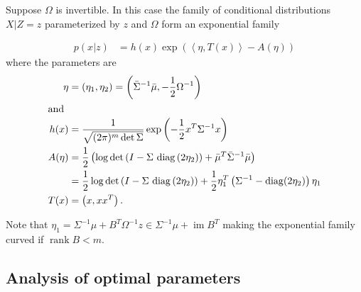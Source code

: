 \begin{proposition}
    \label{prop:exponential_family_posterior}
    Suppose $\Omega$ is invertible.
    In this case the family of conditional distributions $X|Z=z$ parameterized by $z$ and $\Omega$ form an exponential family

    \begin{align*}
        p(x|z) & = h(x) \exp \left( \left\langle \eta, T(x) \right\rangle - A(\eta)\right)
    \end{align*}
    where the parameters are 
    \begin{align*}
      \eta &= \left( \eta_{1}, \eta_{2} \right) = \left( \bar\Sigma^{-1} \bar\mu, -\frac{1}{2} \Omega^{-1}\right) \\
      \intertext{and }
      h(x) &= \frac{1}{\sqrt{(2\pi)^{m} \det \Sigma}}\exp \left( - \frac{1}{2} x^{T} \Sigma^{-1}x \right) \\
      A(\eta) &= \frac{1}{2} \left( \log \det \left( I - \Sigma \,\operatorname{diag} \left( 2 \eta_{2} \right)  \right)  + \bar\mu^{T}\bar\Sigma^{-1}\bar\mu \right) \\
      &= \frac{1}{2} \log \det \left(I - \Sigma \, \operatorname{diag}\left(2\eta_{2}\right)\right) + \frac{1}{2} \eta_{1}^{T} \left( \Sigma^{-1} - \operatorname{diag} (2\eta_{2}) \right)  \eta_{1}\\
      T(x) &= \left( x, x x ^T \right).
    \end{align*}

    Note that $\eta_{1} = \Sigma ^{-1} \mu + B^{T}\Omega^{-1}z \in \Sigma^{-1}\mu + \operatorname{im} B^{T}$ making the exponential family curved if $\operatorname{rank} B < m$.
\end{proposition}

\subsection{Analysis of optimal parameters}
\label{subsec:analysis_of_optimal_parameters}


